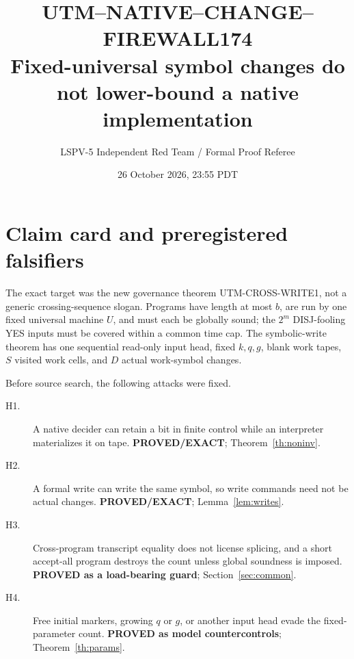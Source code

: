 \documentclass[11pt]{article}
\title{UTM--NATIVE--CHANGE--FIREWALL174\\\large Fixed-universal symbol changes do not lower-bound a native implementation}
\author{LSPV-5 Independent Red Team / Formal Proof Referee}
\date{26 October 2026, 23:55 PDT}
\begin{document}
\maketitle

\begin{center}
\end{center}

\section{Claim card and preregistered falsifiers}
The exact target was the new governance theorem UTM-CROSS-WRITE1, not a generic crossing-sequence slogan.  Programs have length at most $b$, are run by one fixed universal machine $U$, and must each be globally sound; the $2^m$ DISJ-fooling YES inputs must be covered within a common time cap.  The symbolic-write theorem has one sequential read-only input head, fixed $k,q,g$, blank work tapes, $S$ visited work cells, and $D$ actual work-symbol changes.

Before source search, the following attacks were fixed.
\begin{description}
\item[H1.] A native decider can retain a bit in finite control while an interpreter materializes it on tape.  \textbf{PROVED/EXACT}; Theorem~\ref{th:noninv}.
\item[H2.] A formal write can write the same symbol, so write commands need not be actual changes.  \textbf{PROVED/EXACT}; Lemma~\ref{lem:writes}.
\item[H3.] Cross-program transcript equality does not license splicing, and a short accept-all program destroys the count unless global soundness is imposed.  \textbf{PROVED as a load-bearing guard}; Section~\ref{sec:common}.
\item[H4.] Free initial markers, growing $q$ or $g$, or another input head evade the fixed-parameter count.  \textbf{PROVED as model countercontrols}; Theorem~\ref{th:params}.
\end{description}
\end{document}
